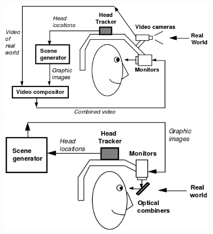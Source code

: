 \begin{figure}
\centering
\begin{subfigure}    
\begin{minipage}[t]{0.49\textwidth}
\includegraphics[width=\linewidth]{schemas/videoST_hmd}
\end{minipage}
\hspace{\fill}
\begin{minipage}[t]{0.49\textwidth}
\includegraphics[width=\linewidth]{schemas/opticalST_hmd}
\end{minipage}


\end{subfigure}
\end{figure}
